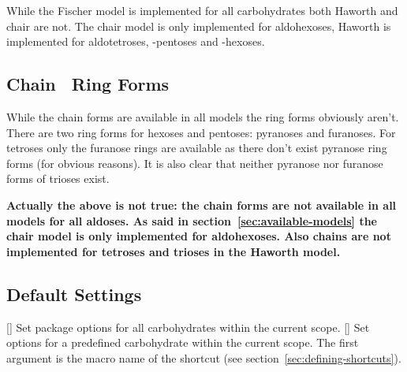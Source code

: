 \documentclass[load-preamble+]{cnltx-doc}
\begin{document}
While the Fischer model is implemented for all carbohydrates both Haworth and
chair are not.  The chair model is only implemented for aldohexoses, Haworth
is implemented for aldotetroses, -pentoses and -hexoses.

\begin{example}
  \glucose[model={fischer=skeleton}]
  \glucose[model={fischer=full}]
  \setatomsep{2.5em}
  \glucose[model=haworth]
  \glucose[model=chair]
\end{example}

\subsection{Chain \vs\ Ring Forms}

While the chain forms are available in all models the ring forms obviously
aren't.  There are two ring forms for hexoses and pentoses: pyranoses and
furanoses.  For tetroses only the furanose rings are available as there don't
exist pyranose ring forms (for obvious reasons).  It is also clear that
neither pyranose nor furanose forms of trioses exist.

\begin{example}
  \setatomsep{2.5em}
  \glucose[model=haworth,ring]
  \ribose[model=haworth,ring]
  \threose[model=haworth,ring]
\end{example}

\textbf{Actually the above is not true: the chain forms are not available in all
models for all aldoses.  As said in section~\ref{sec:available-models} the
chair model is only implemented for aldohexoses.  Also chains are not
implemented for tetroses and trioses in the Haworth model.}

\subsection{Default Settings}
\begin{commands}
  []
    Set package options for all carbohydrates within the current scope.
  []
    Set options for a predefined carbohydrate within the current scope. The
    first argument  is the macro name of the shortcut (see
    section~\ref{sec:defining-shortcuts}).
\end{commands}

\begin{example}
  \setatomsep{2.5em}
  \setcarbohydratedefaults{}
  \glucose\
  \mannose
\end{example}
\end{document}

